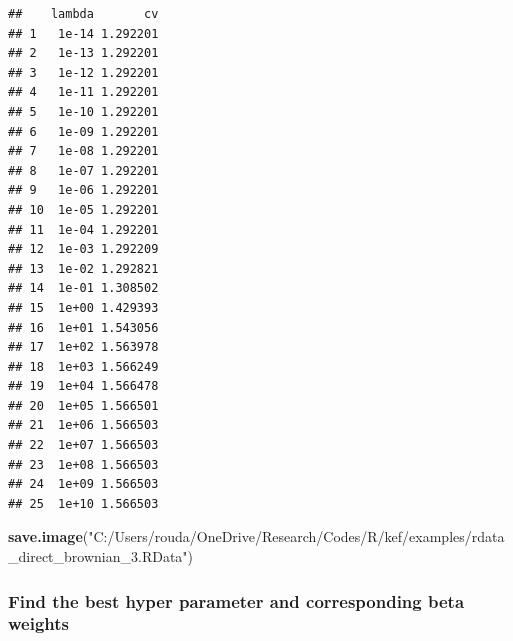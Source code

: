 \documentclass[
]{article}
\newenvironment{Shaded}{\begin{snugshade}}{\end{snugshade}}
\newcommand{\AttributeTok}[1]{\textcolor[rgb]{0.13,0.29,0.53}{#1}}
\newcommand{\CommentTok}[1]{\textcolor[rgb]{0.56,0.35,0.01}{\textit{#1}}}
\newcommand{\DecValTok}[1]{\textcolor[rgb]{0.00,0.00,0.81}{#1}}
\newcommand{\FunctionTok}[1]{\textcolor[rgb]{0.13,0.29,0.53}{\textbf{#1}}}
\newcommand{\NormalTok}[1]{#1}
\newcommand{\OtherTok}[1]{\textcolor[rgb]{0.56,0.35,0.01}{#1}}
\newcommand{\SpecialCharTok}[1]{\textcolor[rgb]{0.81,0.36,0.00}{\textbf{#1}}}
\newcommand{\StringTok}[1]{\textcolor[rgb]{0.31,0.60,0.02}{#1}}
\begin{document}
\begin{verbatim}
##    lambda       cv
## 1   1e-14 1.292201
## 2   1e-13 1.292201
## 3   1e-12 1.292201
## 4   1e-11 1.292201
## 5   1e-10 1.292201
## 6   1e-09 1.292201
## 7   1e-08 1.292201
## 8   1e-07 1.292201
## 9   1e-06 1.292201
## 10  1e-05 1.292201
## 11  1e-04 1.292201
## 12  1e-03 1.292209
## 13  1e-02 1.292821
## 14  1e-01 1.308502
## 15  1e+00 1.429393
## 16  1e+01 1.543056
## 17  1e+02 1.563978
## 18  1e+03 1.566249
## 19  1e+04 1.566478
## 20  1e+05 1.566501
## 21  1e+06 1.566503
## 22  1e+07 1.566503
## 23  1e+08 1.566503
## 24  1e+09 1.566503
## 25  1e+10 1.566503
\end{verbatim}

\begin{Shaded}
\begin{Highlighting}[]
\FunctionTok{save.image}\NormalTok{(}\StringTok{"C:/Users/rouda/OneDrive/Research/Codes/R/kef/examples/rdata\_direct\_brownian\_3.RData"}\NormalTok{)}
\end{Highlighting}
\end{Shaded}

\subsubsection{Find the best hyper parameter and corresponding beta
weights}\label{find-the-best-hyper-parameter-and-corresponding-beta-weights}

\begin{Shaded}
\end{Shaded}
\end{document}
